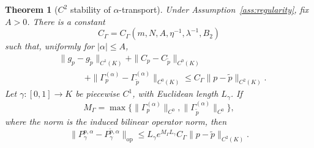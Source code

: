 \documentclass[11pt]{article}
\newtheorem{theorem}{Theorem}[section]
\theoremstyle{definition}
\theoremstyle{remark}
\newcommand{\op}{\mathrm{op}}
\begin{document}
\begin{theorem}[$C^2$ stability of $\alpha$-transport]\label{thm:c2-stability}
Under Assumption~\ref{ass:regularity}, fix $A>0$. There is a constant
\begin{equation}
    C_\Gamma=C_\Gamma(m,N,A,\eta^{-1},\lambda^{-1},B_2)
\end{equation}
such that, uniformly for $|\alpha|\le A$,
\begin{equation}
\begin{split}
    &\|g_p-g_{\widetilde p}\|_{C^1(K)}
    +\|C_p-C_{\widetilde p}\|_{C^0(K)}\\
    &\hspace{3em}
    +\|\Gamma_p^{(\alpha)}-\Gamma_{\widetilde p}^{(\alpha)}\|_{C^0(K)}
    \le C_\Gamma\|p-\widetilde p\|_{C^2(K)}.
\end{split}
\label{eq:connection-stability}
\end{equation}
Let $\gamma:[0,1]\to K$ be piecewise $C^1$, with Euclidean length $L_\gamma$. If
\begin{equation}
    M_\Gamma=\max\bigl\{\|\Gamma_p^{(\alpha)}\|_{C^0},
    \|\Gamma_{\widetilde p}^{(\alpha)}\|_{C^0}\bigr\},
\end{equation}
where the norm is the induced bilinear operator norm, then
\begin{equation}
    \|P_\gamma^{p,\alpha}-P_\gamma^{\widetilde p,\alpha}\|_{\op}
    \le L_\gamma e^{M_\Gamma L_\gamma}C_\Gamma
    \|p-\widetilde p\|_{C^2(K)}.
    \label{eq:pt-stability}
\end{equation}
\end{theorem}
\end{document}
